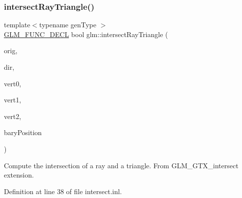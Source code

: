 \subsubsection{\texorpdfstring{intersect\+Ray\+Triangle()}{intersectRayTriangle()}}
{\footnotesize\ttfamily template$<$typename gen\+Type $>$ \\
\hyperlink{setup_8hpp_ab2d052de21a70539923e9bcbf6e83a51}{G\+L\+M\+\_\+\+F\+U\+N\+C\+\_\+\+D\+E\+CL} bool glm\+::intersect\+Ray\+Triangle (\begin{DoxyParamCaption}\item[{gen\+Type const \&}]{orig,  }\item[{gen\+Type const \&}]{dir,  }\item[{gen\+Type const \&}]{vert0,  }\item[{gen\+Type const \&}]{vert1,  }\item[{gen\+Type const \&}]{vert2,  }\item[{gen\+Type \&}]{bary\+Position }\end{DoxyParamCaption})}

Compute the intersection of a ray and a triangle. From G\+L\+M\+\_\+\+G\+T\+X\+\_\+intersect extension. 

Definition at line 38 of file intersect.\+inl.

